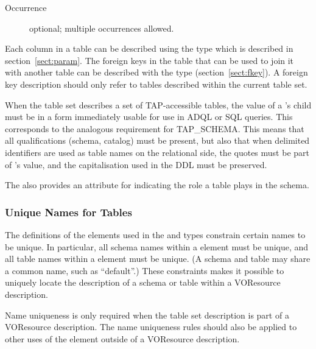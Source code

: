 \documentclass[11pt,a4paper]{ivoa}
\newcommand{\tapschema}{TAP\_SCHE\-MA}
\newcommand{\tapschema}{\mbox{%
  TAP\discretionary{-}{}{\kern-2pt\_}SCHEMA}}
\begin{document}
\begin{generated}
\begin{bigdescription}
\begin{description}
\item[Occurrence] optional; multiple occurrences allowed.

\end{description}


\end{bigdescription}\endgroup

\endgroup
\end{generated}





Each column in a table can be described using the
 type which is described in
section~\ref{sect:param}.  The foreign keys in the table that
can be used to join it with another table can be described with the
 type (section~\ref{sect:fkey}).
A foreign key description should only refer to tables described within
the current table set.  

When the table set describes a set of TAP-accessible tables, the value of
a 's  child must be in a form immediately
usable for use in ADQL or SQL queries. This corresponds to the analogous
requirement for \tapschema.  This means that all qualifications (schema,
catalog) must be present, but also that when delimited
identifiers are used as table names on the relational side,
the quotes must be part of 's value, and the
capitalisation used in the DDL must be preserved.


The  also provides an attribute for indicating
the role a table plays in the schema.





\subsubsection{Unique Names for Tables}
\label{sect:unique}


The definitions of the  elements used in
the  and
 types
constrain certain names to be unique.  In particular, all schema names
within a  element must be unique, and all
table names within a  element must be
unique.  (A schema and table may share a common name, such as
``default''.)  These constraints makes it possible to uniquely locate
the description of a schema or table within a VOResource description.  

Name uniqueness is only required when the table set description is
part of a VOResource description.  The name uniqueness rules
should also be applied to other uses of the
 element outside of a VOResource
description.  
\end{document}

